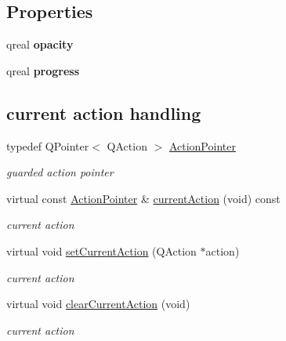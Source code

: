 \subsection*{Properties}
\begin{DoxyCompactItemize}
\item 
\mbox{\label{class_menu_bar_data_v2_a62de1f0463d5d419514d55afe1b4a005}} 
qreal {\bfseries opacity}
\item 
\mbox{\label{class_menu_bar_data_v2_a52042b2f892d835b7d22906b2bb01eeb}} 
qreal {\bfseries progress}
\end{DoxyCompactItemize}
\subsection*{current action handling}
\begin{DoxyCompactItemize}
\item 
\mbox{\label{class_menu_bar_data_v2_a7c0030df6f042d2fea35ae0a9f28abd2}} 
typedef Q\+Pointer$<$ Q\+Action $>$ \hyperlink{class_menu_bar_data_v2_a7c0030df6f042d2fea35ae0a9f28abd2}{Action\+Pointer}
\begin{DoxyCompactList}\small\item\em guarded action pointer \end{DoxyCompactList}\item 
\mbox{\label{class_menu_bar_data_v2_ab912a2397b6433367df3599e1840f936}} 
virtual const \hyperlink{class_menu_bar_data_v2_a7c0030df6f042d2fea35ae0a9f28abd2}{Action\+Pointer} \& \hyperlink{class_menu_bar_data_v2_ab912a2397b6433367df3599e1840f936}{current\+Action} (void) const
\begin{DoxyCompactList}\small\item\em current action \end{DoxyCompactList}\item 
\mbox{\label{class_menu_bar_data_v2_a1367ae49f1dbc87c57e9dfb09fc5702c}} 
virtual void \hyperlink{class_menu_bar_data_v2_a1367ae49f1dbc87c57e9dfb09fc5702c}{set\+Current\+Action} (Q\+Action $\ast$action)
\begin{DoxyCompactList}\small\item\em current action \end{DoxyCompactList}\item 
\mbox{\label{class_menu_bar_data_v2_a160b43bd9eace7ca127180f5c7dd0f41}} 
virtual void \hyperlink{class_menu_bar_data_v2_a160b43bd9eace7ca127180f5c7dd0f41}{clear\+Current\+Action} (void)
\begin{DoxyCompactList}\small\item\em current action \end{DoxyCompactList}\end{DoxyCompactItemize}
